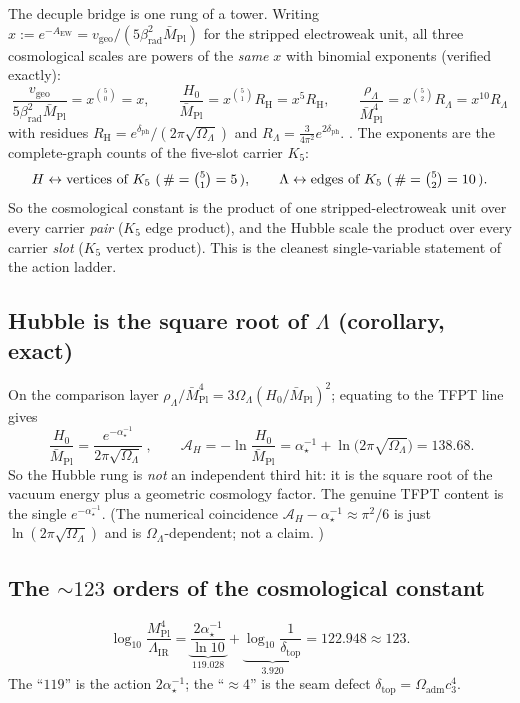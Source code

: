 \documentclass[11pt,a4paper]{article}
\newcommand{\MPl}{M_{\mathrm{Pl}}}
\newcommand{\Mbar}{\bar M_{\mathrm{Pl}}}
\newcommand{\Oadm}{\Omega_{\mathrm{adm}}}
\newcommand{\cthree}{c_3}
\newcommand{\dtop}{\delta_{\mathrm{top}}}
\newcommand{\dph}{\delta_{\mathrm{ph}}}
\newcommand{\betarad}{\beta_{\mathrm{rad}}}
\newcommand{\ainv}{\alpha^{-1}_\star}
\newcommand{\LamIR}{\Lambda_{\mathrm{IR}}}
\newcommand{\AEW}{A_{\mathrm{EW}}}
\newcommand{\AH}{\mathcal A_H}
\theoremstyle{definition}
\begin{document}
The decuple bridge is one rung of a tower. Writing $x:=e^{-\AEW}=v_{\mathrm{geo}}/(5\betarad^2\Mbar)$
for the stripped electroweak unit, all three cosmological scales are powers of the \emph{same} $x$
with binomial exponents (verified exactly):
\begin{equation}
  \boxed{\ \frac{v_{\mathrm{geo}}}{5\betarad^2\Mbar}=x^{\binom50}=x,\qquad
  \frac{H_0}{\Mbar}=x^{\binom51}R_{\mathrm H}=x^5R_{\mathrm H},\qquad
  \frac{\rho_\Lambda}{\Mbar^4}=x^{\binom52}R_\Lambda=x^{10}R_\Lambda\ }
\end{equation}
with residues $R_{\mathrm H}=e^{\dph}/(2\pi\sqrt{\Omega_\Lambda})$ and $R_\Lambda=\tfrac{3}{4\pi^2}e^{2\dph}$.
\mE. The exponents are the complete-graph counts of the five-slot carrier $K_5$:
\[
  H \leftrightarrow \text{vertices of }K_5\ (\,\#=\tbinom51=5\,),\qquad
  \Lambda \leftrightarrow \text{edges of }K_5\ (\,\#=\tbinom52=10\,).
\]
So the cosmological constant is the product of one stripped-electroweak unit over every carrier
\emph{pair} ($K_5$ edge product), and the Hubble scale the product over every carrier \emph{slot}
($K_5$ vertex product). This is the cleanest single-variable statement of the action ladder.

\subsection{Hubble is the square root of $\Lambda$ (corollary, exact)}

On the comparison layer $\rho_\Lambda/\Mbar^4=3\Omega_\Lambda(H_0/\Mbar)^2$; equating to the TFPT
line gives
\begin{equation}
  \boxed{\ \frac{H_0}{\Mbar}=\frac{e^{-\ainv}}{2\pi\sqrt{\Omega_\Lambda}}\ },\qquad
  \AH=-\ln\frac{H_0}{\Mbar}=\ainv+\ln\!\bigl(2\pi\sqrt{\Omega_\Lambda}\bigr)=138.68 .
\end{equation}
So the Hubble rung is \emph{not} an independent third hit: it is the square root of the vacuum
energy plus a geometric cosmology factor. The genuine TFPT content is the single $e^{-\ainv}$.
(The numerical coincidence $\AH-\ainv\approx\pi^2/6$ is just $\ln(2\pi\sqrt{\Omega_\Lambda})$ and is
$\Omega_\Lambda$-dependent; not a claim. \mO)

\subsection{The $\sim123$ orders of the cosmological constant}
\begin{equation}
  \log_{10}\frac{\MPl^4}{\LamIR}
  =\underbrace{\frac{2\ainv}{\ln10}}_{119.028}+\underbrace{\log_{10}\frac{1}{\dtop}}_{3.920}
  =122.948\approx123 .
\end{equation}
The ``$119$'' is the action $2\ainv$; the ``$\approx4$'' is the seam defect $\dtop=\Oadm\cthree^4$.
\end{document}
